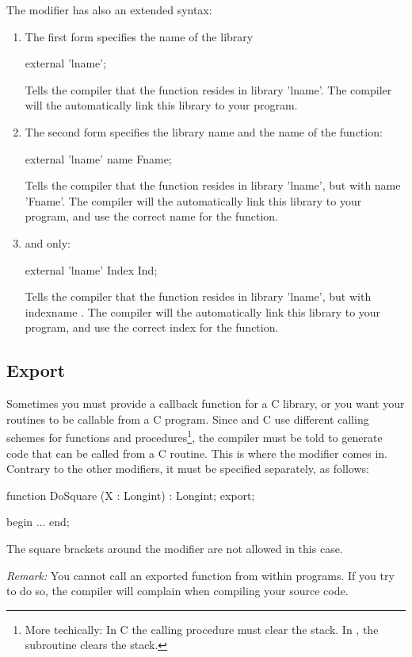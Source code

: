 \documentclass{report}
\begin{document}
The  modifier has also an extended syntax:
\begin{enumerate}
\item The first form specifies the name of the library
\begin{listing}
external 'lname';
\end{listing}
Tells the compiler that the function resides in library 'lname'. The
compiler will the automatically link this library to your program.
\item The second form specifies the library name and the name of the
function:
\begin{listing}
external 'lname' name Fname;
\end{listing}
Tells the compiler that the function resides in library 'lname', but with
name 'Fname'. The compiler will the automatically link this library to your
program, and use the correct name for the function.
\item \windows and \ostwo only:
\begin{listing}
external 'lname' Index Ind;
\end{listing}
Tells the compiler that the function resides in library 'lname', but with
indexname . The compiler will the automatically link this library to your
program, and use the correct index for the function.
\end{enumerate}

\subsection{Export}
Sometimes you must provide a callback function for a C library, or you want
your routines to be callable from a C program. Since \fpc and C use
different calling schemes for functions and procedures\footnote{More
techically: In C the calling procedure must clear the stack. In \fpc, the
subroutine clears the stack.}, the compiler must be told to generate code
that can be called from a C routine. This is where the  modifier
comes in. Contrary to the other modifiers, it must be specified separately,
as follows:
\begin{listing}
function DoSquare (X : Longint) : Longint; export;

begin
...
end;
\end{listing} 
The square brackets around the modifier are not allowed in this case.

{\em Remark:} You cannot call an exported function from within \fpc programs.
If you try to do so, the compiler will complain when compiling your source
code.
\end{document}
